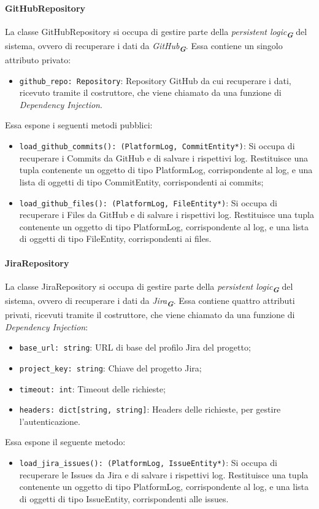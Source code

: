 \paragraph{GitHubRepository}
\label{sec:github_repository}
La classe GitHubRepository si occupa di gestire parte della \emph{persistent logic}\textsubscript{\textbf{\textit{G}}} del sistema, ovvero di recuperare i dati da \emph{GitHub}\textsubscript{\textbf{\textit{G}}}. Essa contiene un singolo attributo privato:
\begin{itemize}
    \item \texttt{github\_repo: Repository}: Repository GitHub da cui recuperare i dati, ricevuto tramite il costruttore, che viene chiamato da una funzione di \emph{Dependency Injection}.
\end{itemize}
Essa espone i seguenti metodi pubblici:
\begin{itemize}
    \item \texttt{load\_github\_commits(): (PlatformLog, CommitEntity*)}: Si occupa di recuperare i Commits da GitHub e di salvare i rispettivi log. Restituisce una tupla contenente un oggetto di tipo PlatformLog, corrispondente al log, e una lista di oggetti di tipo CommitEntity, corrispondenti ai commits;
    \item \texttt{load\_github\_files(): (PlatformLog, FileEntity*)}: Si occupa di recuperare i Files da GitHub e di salvare i rispettivi log. Restituisce una tupla contenente un oggetto di tipo PlatformLog, corrispondente al log, e una lista di oggetti di tipo FileEntity, corrispondenti ai files.
\end{itemize}

\paragraph{JiraRepository}
\label{sec:jira_repository}
La classe JiraRepository si occupa di gestire parte della \emph{persistent logic}\textsubscript{\textbf{\textit{G}}} del sistema, ovvero di recuperare i dati da \emph{Jira}\textsubscript{\textbf{\textit{G}}}. Essa contiene quattro attributi privati, ricevuti tramite il costruttore, che viene chiamato da una funzione di \emph{Dependency Injection}:
\begin{itemize}
    \item \texttt{base\_url: string}: URL di base del profilo Jira del progetto;
    \item \texttt{project\_key: string}: Chiave del progetto Jira;
    \item \texttt{timeout: int}: Timeout delle richieste;
    \item \texttt{headers: dict[string, string]}: Headers delle richieste, per gestire l'autenticazione.
\end{itemize}
Essa espone il seguente metodo:
\begin{itemize}
    \item \texttt{load\_jira\_issues(): (PlatformLog, IssueEntity*)}: Si occupa di recuperare le Issues da Jira e di salvare i rispettivi log. Restituisce una tupla contenente un oggetto di tipo PlatformLog, corrispondente al log, e una lista di oggetti di tipo IssueEntity, corrispondenti alle issues.
\end{itemize}

